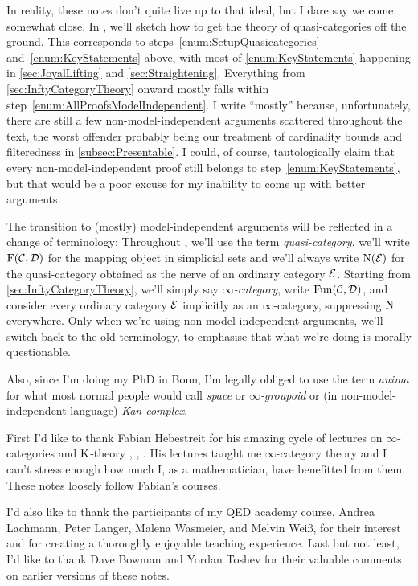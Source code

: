 \documentclass[DIV=12,numbers=enddot,leqno,bibliography=totoc]{scrartcl}
\begin{document}
\begin{numpar}
		In reality, these notes don't quite live up to that ideal, but I dare say we come somewhat close. In , we'll sketch how to get the theory of quasi-categories off the ground. This corresponds to steps~\cref{enum:SetupQuasicategories} and~\cref{enum:KeyStatements} above, with most of \cref{enum:KeyStatements} happening in \cref{sec:JoyalLifting} and \cref{sec:Straightening}. Everything from \cref{sec:InftyCategoryTheory} onward mostly falls within step~\cref{enum:AllProofsModelIndependent}. I write \enquote{mostly} because, unfortunately, there are still a few non-model-independent arguments scattered throughout the text, the worst offender probably being our treatment of cardinality bounds and filteredness in \cref{subsec:Presentable}. I could, of course, tautologically claim that every non-model-independent proof still belongs to step~\cref{enum:KeyStatements}, but that would be a poor excuse for my inability to come up with better arguments.
		
		The transition to (mostly) model-independent arguments will be reflected in a change of terminology: Throughout , we'll use the term  \emph{quasi-category}, we'll write $\operatorname{F}(\mathcal{C},\mathcal{D})$ for the mapping object in simplicial sets and we'll always write $\operatorname{N}(\mathcal{E})$ for the quasi-category obtained as the nerve of an ordinary category $\mathcal{E}$. Starting from \cref{sec:InftyCategoryTheory}, we'll simply say \emph{$\infty$-category}, write $\operatorname{Fun}(\mathcal{C},\mathcal{D})$, and consider every ordinary category $\mathcal{E}$ implicitly as an $\infty$-category, suppressing $\operatorname{N}$ everywhere. Only when we're using non-model-independent arguments, we'll switch back to the old terminology, to emphasise that what we're doing is morally questionable.
		
		Also, since I'm doing my PhD in Bonn, I'm legally obliged to use the term \emph{anima} for what most normal people would call \emph{space} or \emph{$\infty$-groupoid} or (in non-model-independent language) \emph{Kan complex}.
	\end{numpar}
	\begin{numpar}[Acknowledgments.]
		First I'd like to thank Fabian Hebestreit for his amazing cycle of lectures on $\infty$-categories and $\operatorname{K}$-theory \cite{HigherCatsI}, \cite{HigherCatsII}, \cite{KTheory}. His lectures taught me $\infty$-category theory and I can't stress enough how much I, as a mathematician, have benefitted from them. These notes loosely follow Fabian's courses.
		
		I'd also like to thank the participants of my QED academy course, Andrea Lachmann, Peter Langer, Malena Wasmeier, and Melvin Weiß, for their interest and for creating a thoroughly enjoyable teaching experience. Last but not least, I'd like to thank Dave Bowman and Yordan Toshev for their valuable comments on earlier versions of these notes.
	\end{numpar}
	
\end{document}
